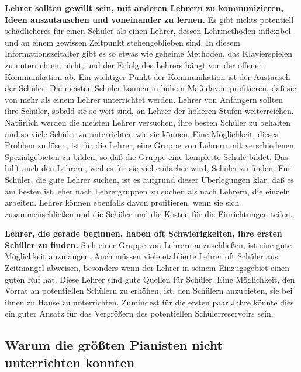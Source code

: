 \textbf{Lehrer sollten gewillt sein, mit anderen Lehrern zu kommunizieren, Ideen auszutauschen und voneinander zu lernen.}
Es gibt nichts potentiell schädlicheres für einen Schüler als einen Lehrer, dessen Lehrmethoden inflexibel und an einem gewissen Zeitpunkt stehengeblieben sind.
In diesem Informationszeitalter gibt es so etwas wie geheime Methoden, das Klavierspielen zu unterrichten, nicht, und der Erfolg des Lehrers hängt von der offenen Kommunikation ab.
Ein wichtiger Punkt der Kommunikation ist der Austausch der Schüler.
Die meisten Schüler können in hohem Maß davon profitieren, daß sie von mehr als einem Lehrer unterrichtet werden.
Lehrer von Anfängern sollten ihre Schüler, sobald sie so weit sind, an Lehrer der höheren Stufen weiterreichen.
Natürlich werden die meisten Lehrer versuchen, ihre besten Schüler zu behalten und so viele Schüler zu unterrichten wie sie können.
Eine Möglichkeit, dieses Problem zu lösen, ist für die Lehrer, eine Gruppe von Lehrern mit verschiedenen Spezialgebieten zu bilden, so daß die Gruppe eine komplette Schule bildet.
Das hilft auch den Lehrern, weil es für sie viel einfacher wird, Schüler zu finden.
Für Schüler, die gute Lehrer suchen, ist es aufgrund dieser Überlegungen klar, daß es am besten ist, eher nach Lehrergruppen zu suchen als nach Lehrern, die einzeln arbeiten.
Lehrer können ebenfalls davon profitieren, wenn sie sich zusammenschließen und die Schüler und die Kosten für die Einrichtungen teilen.

\textbf{Lehrer, die gerade beginnen, haben oft Schwierigkeiten, ihre ersten Schüler zu finden.}
Sich einer Gruppe von Lehrern anzuschließen, ist eine gute Möglichkeit anzufangen.
Auch müssen viele etablierte Lehrer oft Schüler aus Zeitmangel abweisen, besonders wenn der Lehrer in seinem Einzugsgebiet einen guten Ruf hat.
Diese Lehrer sind gute Quellen für Schüler.
Eine Möglichkeit, den Vorrat an potentiellen Schülern zu erhöhen, ist, den Schülern anzubieten, sie bei ihnen zu Hause zu unterrichten.
Zumindest für die ersten paar Jahre könnte dies ein guter Ansatz für das Vergrößern des potentiellen Schülerreservoirs sein.


\subsection{Warum die größten Pianisten nicht unterrichten konnten}
\label{c1iii16e}

